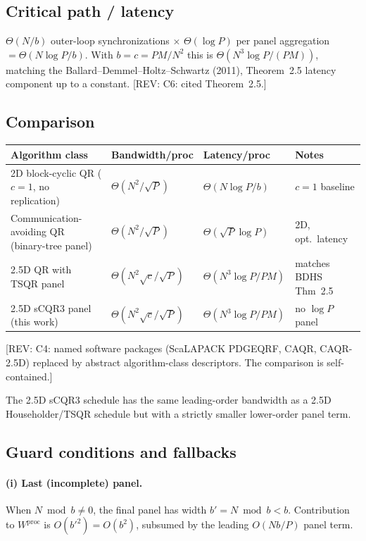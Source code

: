 \documentclass[11pt]{article}
\newcommand{\REV}[1]{\textcolor{blue!60!black}{\small\textsf{[REV: #1]}}}
\begin{document}
\subsection{Critical path / latency}
\label{sec:A3f}
$\Theta(N/b)$ outer-loop synchronizations $\times$ $\Theta(\log P)$ per
panel aggregation $= \Theta(N\log P / b)$. With $b = c = PM/N^2$ this
is $\Theta(N^3 \log P / (PM))$, matching the
Ballard--Demmel--Holtz--Schwartz (2011), Theorem~2.5 latency
component up to a constant. \REV{C6: cited Theorem~2.5.}

\subsection{Comparison}
\label{sec:A3g}

\begin{center}
\setlength{\tabcolsep}{4pt}
\begin{tabular}{@{}llll@{}}
\toprule
Algorithm class & Bandwidth/proc & Latency/proc & Notes \\
\midrule
2D block-cyclic QR ($c{=}1$, no replication)  & $\Theta(N^2/\sqrt{P})$           & $\Theta(N \log P / b)$    & $c{=}1$ baseline \\
Communication-avoiding QR (binary-tree panel) & $\Theta(N^2/\sqrt{P})$           & $\Theta(\sqrt{P}\log P)$  & 2D, opt.\ latency \\
2.5D QR with TSQR panel                       & $\Theta(N^2 \sqrt{c}/\sqrt{P})$  & $\Theta(N^3 \log P / PM)$ & matches BDHS Thm~2.5 \\
2.5D sCQR3 panel (this work)                  & $\Theta(N^2 \sqrt{c}/\sqrt{P})$  & $\Theta(N^3 \log P / PM)$ & no $\log P$ panel \\
\bottomrule
\end{tabular}
\end{center}
\REV{C4: named software packages (ScaLAPACK PDGEQRF, CAQR, CAQR-2.5D)
replaced by abstract algorithm-class descriptors. The comparison is
self-contained.}

The 2.5D sCQR3 schedule has the same leading-order bandwidth as a
2.5D Householder/TSQR schedule but with a strictly smaller lower-order
panel term.

\subsection{Guard conditions and fallbacks}
\label{sec:A3h}

\paragraph{(i) Last (incomplete) panel.}
When $N \bmod b \ne 0$, the final panel has width $b' = N \bmod b < b$.
Contribution to $W^{\mathrm{proc}}$ is $O(b'^2) = O(b^2)$, subsumed by
the leading $O(Nb/P)$ panel term.
\end{document}
